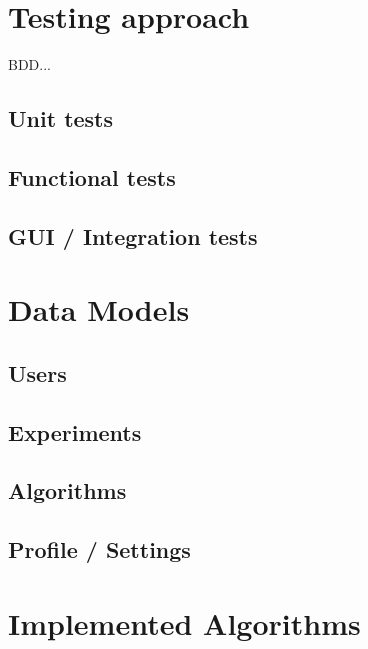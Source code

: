 \section{Testing approach}
\label{sect:testing_approach}

	BDD...
	
	\subsection{Unit tests}
	\label{ssect:unittests}
	
	\subsection{Functional tests}
	\label{ssect:func_tests}
	
	\subsection{GUI / Integration tests}
	\label{ssect:int_tests}


\section{Data Models}
\label{sect:data_models}

	\subsection{Users}
	\label{ssect:users}
	
	\subsection{Experiments}
	\label{ssect:experiments}
	
	\subsection{Algorithms}
	\label{ssect:algorithms}

	\subsection{Profile / Settings}
	\label{ssect:settings}


\section{Implemented Algorithms}
\label{sect:implemented_algos}

